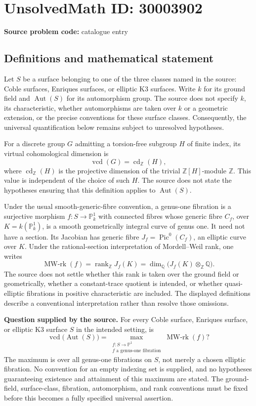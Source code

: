 \documentclass[11pt]{article}
\newcommand{\Z}{\mathbb{Z}}
\newcommand{\Q}{\mathbb{Q}}
\newcommand{\PP}{\mathbb{P}}
\begin{document}
\section*{UnsolvedMath ID: 30003902}
\textbf{Source problem code:} catalogue entry
\subsection{Definitions and mathematical statement}
Let \(S\) be a surface belonging to one of the three classes named in the source: Coble surfaces, Enriques surfaces, or elliptic K3 surfaces. Write \(k\) for its ground field and \(\operatorname{Aut}(S)\) for its automorphism group. The source does not specify \(k\), its characteristic, whether automorphisms are taken over \(k\) or a geometric extension, or the precise conventions for these surface classes. Consequently, the universal quantification below remains subject to unresolved hypotheses.

For a discrete group \(G\) admitting a torsion-free subgroup \(H\) of finite index, its virtual cohomological dimension is
\[
\operatorname{vcd}(G)=\operatorname{cd}_{\Z}(H),
\]
where \(\operatorname{cd}_{\Z}(H)\) is the projective dimension of the trivial \(\Z[H]\)-module \(\Z\). This value is independent of the choice of such \(H\). The source does not state the hypotheses ensuring that this definition applies to \(\operatorname{Aut}(S)\).

Under the usual smooth-generic-fibre convention, a genus-one fibration is a surjective morphism \(f:S\to\PP^1_k\) with connected fibres whose generic fibre \(C_f\), over \(K=k(\PP^1_k)\), is a smooth geometrically integral curve of genus one. It need not have a section. Its Jacobian has generic fibre \(J_f=\operatorname{Pic}^0(C_f)\), an elliptic curve over \(K\). Under the rational-section interpretation of Mordell--Weil rank, one writes
\[
\operatorname{MW\text{-}rk}(f)
=\operatorname{rank}_{\Z}J_f(K)
=\dim_{\Q}\bigl(J_f(K)\otimes_{\Z}\Q\bigr).
\]
The source does not settle whether this rank is taken over the ground field or geometrically, whether a constant-trace quotient is intended, or whether quasi-elliptic fibrations in positive characteristic are included. The displayed definitions describe a conventional interpretation rather than resolve those omissions.

\textbf{Question supplied by the source.} For every Coble surface, Enriques surface, or elliptic K3 surface \(S\) in the intended setting, is
\[
\operatorname{vcd}\bigl(\operatorname{Aut}(S)\bigr)
=\max_{\substack{f:S\to\PP^1\\ f\text{ a genus-one fibration}}}
\operatorname{MW\text{-}rk}(f)?
\]
The maximum is over all genus-one fibrations on \(S\), not merely a chosen elliptic fibration. No convention for an empty indexing set is supplied, and no hypotheses guaranteeing existence and attainment of this maximum are stated. The ground-field, surface-class, fibration, automorphism, and rank conventions must be fixed before this becomes a fully specified universal assertion.
\end{document}
